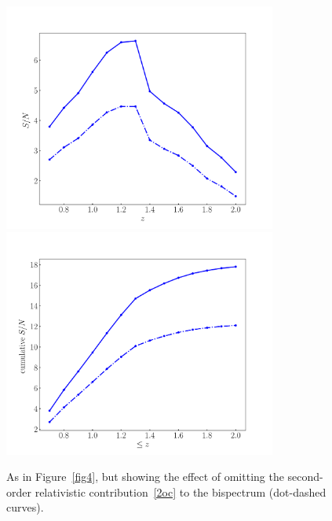 \begin{figure}[!ht]
\centering
\includegraphics[width=0.8\textwidth]{fig/DoppSnr_K2D-eps-converted-to}
\includegraphics[width=0.8\textwidth]{fig/cumDoppSnr_K2D-eps-converted-to}
\caption{As in Figure~\ref{fig4}, but showing the effect of omitting the second-order relativistic contribution~\eqref{2oc} to the bispectrum (dot-dashed curves).} \label{fig4z}
\end{figure}

